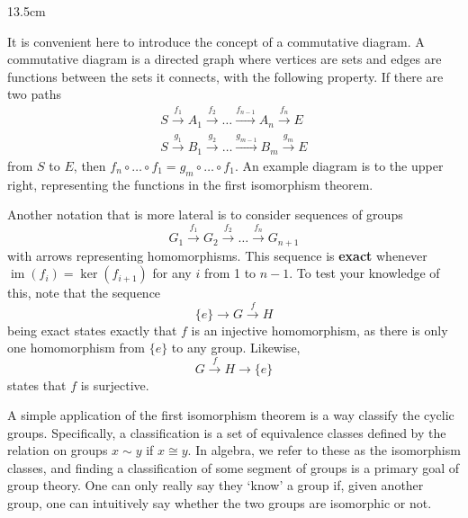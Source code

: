 \documentclass[12pt]{amsbook}
\theoremstyle{plain}
\theoremstyle{definition}
\DeclareMathOperator{\im}{im}
\begin{document}
\begin{wrapfigure}{1}{3.5cm}
\end{wrapfigure}

It is convenient here to introduce the concept of a commutative diagram. A commutative diagram is a directed graph where vertices are sets and edges are functions between the sets it connects, with the following property. If there are two paths
%
\begin{align*}
    S \xrightarrow{f_1} A_1 \xrightarrow{f_2} \dots \xrightarrow{f_{n-1}} A_n \xrightarrow{f_n} E\\
    S \xrightarrow{g_1} B_1 \xrightarrow{g_2} \dots \xrightarrow{g_{m-1}} B_m \xrightarrow{g_m} E
\end{align*}
%
from $S$ to $E$, then $f_n \circ \dots \circ f_1 = g_m \circ \dots \circ f_1$. An example diagram is to the upper right, representing the functions in the first isomorphism theorem.

Another notation that is more lateral is to consider sequences of groups
%
\[ G_1 \xrightarrow{f_1} G_2 \xrightarrow{f_2} \dots \xrightarrow{f_{n}}G_{n+1} \]
%
with arrows representing homomorphisms. This sequence is {\bf exact} whenever $\im(f_i) = \ker(f_{i+1})$ for any $i$ from 1 to $n-1$. To test your knowledge of this, note that the sequence
%
\[ \{ e \} \xrightarrow{} G \xrightarrow{f} H \]
%
being exact states exactly that $f$ is an injective homomorphism, as there is only one homomorphism from $\{ e \}$ to any group. Likewise,
%
\[ G \xrightarrow{f} H \xrightarrow{} \{ e \} \]
%
states that $f$ is surjective.

A simple application of the first isomorphism theorem is a way classify the cyclic groups. Specifically, a classification  is a set of equivalence classes defined by the relation on groups $x \sim y$ if $x \cong y$. In algebra, we refer to these as the isomorphism classes, and finding a classification of some segment of groups is a primary goal of group theory. One can only really say they `know' a group if, given another group, one can intuitively say whether the two groups are isomorphic or not.
\end{document}
